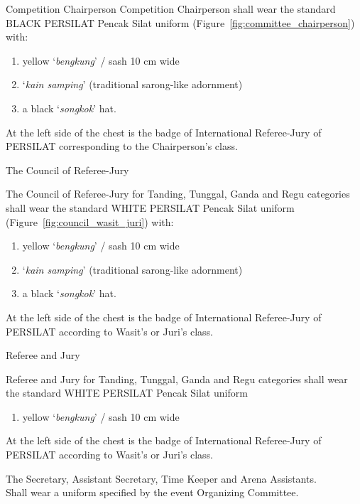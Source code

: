 \begin{legal}
\item Competition Chairperson
Competition Chairperson shall wear the standard BLACK PERSILAT Pencak Silat uniform 
(Figure~\ref{fig:committee_chairperson}) with:

    \begin{enumerate}[label=\alph*.]
    \item yellow `\emph{bengkung}' / sash 10 cm wide 
    \item `\emph{kain samping}' (traditional sarong-like adornment)
    \item a black `\emph{songkok}' hat.
    \end{enumerate}

At the left side of the chest is the badge of International Referee-Jury of PERSILAT
corresponding to the Chairperson's class. 

\item The Council of Referee-Jury

The Council of Referee-Jury for Tanding, Tunggal, Ganda and Regu categories shall wear the
standard WHITE PERSILAT Pencak Silat uniform (Figure~\ref{fig:council_wasit_juri}) with:

    \begin{enumerate}[label=\alph*.]
    \item yellow `\emph{bengkung}' / sash 10 cm wide 
    \item `\emph{kain samping}' (traditional sarong-like adornment)
    \item a black `\emph{songkok}' hat.
    \end{enumerate}

At the left side of the chest is the badge of International Referee-Jury of PERSILAT
according to Wasit's or Juri's class. 

\item Referee and Jury

Referee and Jury for Tanding, Tunggal, Ganda and Regu categories shall wear the 
standard WHITE PERSILAT Pencak Silat uniform

    \begin{enumerate}[label=\alph*.]
    \item yellow `\emph{bengkung}' / sash 10 cm wide 
    \end{enumerate}

At the left side of the chest is the badge of International Referee-Jury of PERSILAT
according to Wasit's or Juri's class. 

\item The Secretary, Assistant Secretary, Time Keeper and Arena Assistants. \\

Shall wear a uniform specified by the event Organizing Committee.

\end{legal}

